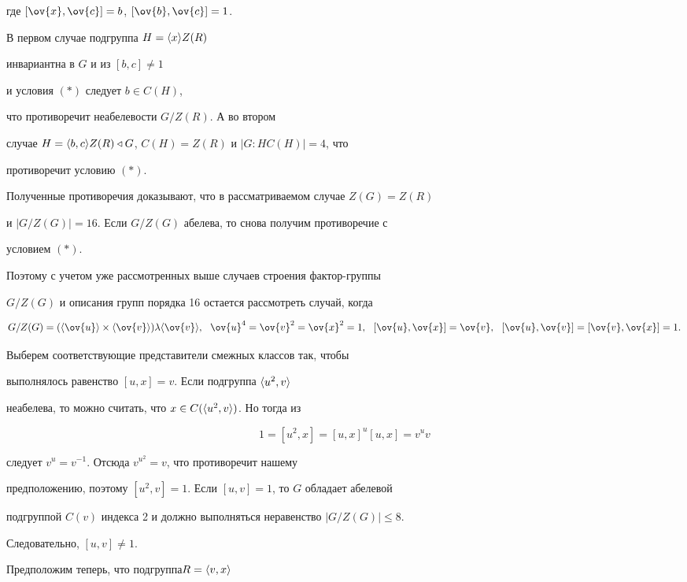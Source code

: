 где $[\ov{x},\ov{c}]=b$, $[\ov{b},\ov{c}]=1$.





В первом случае подгруппа $H=\langle x\rangle Z(R)$ 


инвариантна в $G$ и из $[b,c]\ne 1$


и условия $(\ast)$ следует $b\in C(H)$,


что противоречит неабелевости $G/Z(R)$. А во втором 


случае $H=\langle b,c\rangle Z(R)\triangleleft G$, $C(H)=Z(R)$ и $|G:HC(H)|=4$, что


противоречит условию $(\ast)$.





Полученные противоречия доказывают, что в рассматриваемом случае $Z(G)=Z(R)$


и $|G/Z(G)|=16$. Если $G/Z(G)$ абелева, то снова получим противоречие с


условием $(\ast)$. 


Поэтому с учетом уже рассмотренных выше случаев строения фактор-группы


$G/Z(G)$ и описания групп порядка 16 остается рассмотреть случай, когда


$$


G/Z(G)=(\ls\ov{u}\ps\times\ls\ov{v}\ps)\lambda\ls\ov{v}\ps,\ \


\ov{u}^4=\ov{v}^2=\ov{x}^2=1,\ \ [\ov{u},\ov{x}]=


\ov{v},\ \ [\ov{u},\ov{v}]=[\ov{v},\ov{x}]=1.


$$


Выберем соответствующие представители смежных классов так, чтобы 


выполнялось равенство $[u,x]=v$. Если подгруппа $\langle u^2,v\rangle$


неабелева, то можно считать, что $x\in C(\langle u^2, v\rangle)$. Но тогда из


$$


1=[u^2,x]=[u,x]^u[u,x]=v^uv


$$


следует $v^u=v^{-1}$. Отсюда $v^{u^2}=v$, что противоречит нашему


предположению, поэтому $[u^2,v]{=}1$. Если $[u,v]=1$, то $G$ обладает абелевой


подгруппой $C(v)$ индекса 2 и должно выполняться неравенство $|G/Z(G)|\le 8$.


Следовательно, $[u,v]\ne 1$.


Предположим теперь, что подгруппа\linebreak $R=\langle v,x\rangle$


